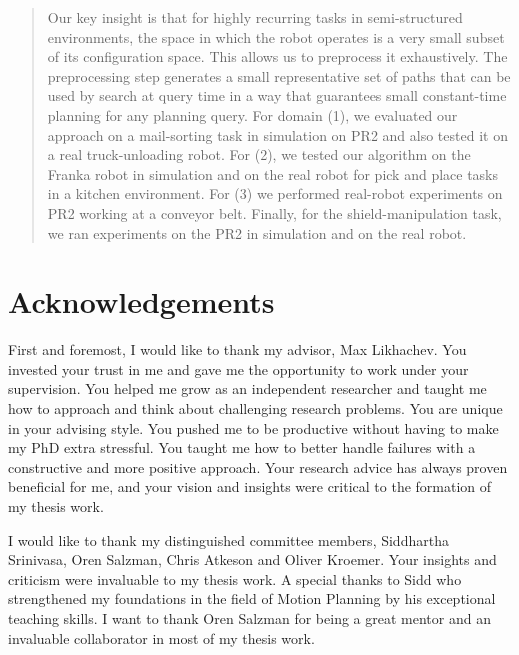 \documentclass[a4paper]{report}
\begin{document}
\begin{abstract}
Our key insight is that for highly recurring tasks in semi-structured environments, the space in which the robot operates is a very small subset of its configuration space. This allows us to preprocess it exhaustively. The preprocessing step generates a small representative set of paths that can be used by search at query time in a way that guarantees small constant-time planning for any planning query.
%
For domain (1), we evaluated our approach on a mail-sorting task in simulation on PR2 and also tested it on a real truck-unloading robot. For (2), we tested our algorithm on the Franka robot in simulation and on the real robot for pick and place tasks in a kitchen environment. For (3) we performed real-robot experiments on PR2 working at a conveyor belt. Finally, for the shield-manipulation task, we ran experiments on the PR2 in simulation and on the real robot.



\end{abstract}
\newpage

\chapter*{Acknowledgements}
First and foremost, I would like to thank my advisor, Max Likhachev. You invested your trust in me and gave me the opportunity to work under your supervision. 
You helped me grow as an independent researcher and taught me how to approach and think about challenging research problems.
You are unique in your advising style. You pushed me to be productive without having to make my PhD extra stressful. You taught me how to better handle failures with a constructive and more positive approach. Your research advice has always proven beneficial for me, and your vision and insights were critical to the formation of my thesis work.

I would like to thank my distinguished committee members, Siddhartha Srinivasa, Oren Salzman, Chris Atkeson and Oliver Kroemer. Your insights and criticism were invaluable to my thesis work. A special thanks to Sidd who strengthened my foundations in the field of Motion Planning by his exceptional teaching skills. I want to thank Oren Salzman for being a great mentor and an invaluable collaborator in most of my thesis work.
\end{document}
